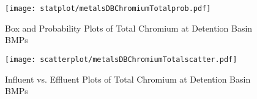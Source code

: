         \begin{figure}[hb]   %
            \centering
            \texttt{[image: statplot/metalsDBChromiumTotalprob.pdf]}
            \caption{Box and Probability Plots of Total Chromium at Detention Basin BMPs}
        \end{figure}         %
        
        
        \begin{figure}[hb]   %
            \centering
            \texttt{[image: scatterplot/metalsDBChromiumTotalscatter.pdf]}
            \caption{Influent vs. Effluent Plots of Total Chromium at Detention Basin BMPs}
        \end{figure}         %
        \clearpage
        